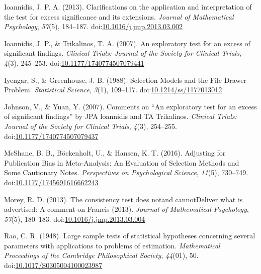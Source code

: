 \documentclass[man,floatsintext]{apa6}
\begin{document}
\leavevmode\hypertarget{ref-ioannidis2013ClarificationsApplicationInterpretation}{}%
Ioannidis, J. P. A. (2013). Clarifications on the application and interpretation of the test for excess significance and its extensions. \emph{Journal of Mathematical Psychology}, \emph{57}(5), 184--187. doi:\href{https://doi.org/10.1016/j.jmp.2013.03.002}{10.1016/j.jmp.2013.03.002}

\leavevmode\hypertarget{ref-ioannidis2007ExploratoryTestExcess}{}%
Ioannidis, J. P., \& Trikalinos, T. A. (2007). An exploratory test for an excess of significant findings. \emph{Clinical Trials: Journal of the Society for Clinical Trials}, \emph{4}(3), 245--253. doi:\href{https://doi.org/10.1177/1740774507079441}{10.1177/1740774507079441}

\leavevmode\hypertarget{ref-iyengar1988SelectionModelsFile}{}%
Iyengar, S., \& Greenhouse, J. B. (1988). Selection Models and the File Drawer Problem. \emph{Statistical Science}, \emph{3}(1), 109--117. doi:\href{https://doi.org/10.1214/ss/1177013012}{10.1214/ss/1177013012}

\leavevmode\hypertarget{ref-johnson2007CommentsExploratoryTest}{}%
Johnson, V., \& Yuan, Y. (2007). Comments on ``An exploratory test for an excess of significant findings'' by JPA loannidis and TA Trikalinos. \emph{Clinical Trials: Journal of the Society for Clinical Trials}, \emph{4}(3), 254--255. doi:\href{https://doi.org/10.1177/1740774507079437}{10.1177/1740774507079437}

\leavevmode\hypertarget{ref-mcshane2016AdjustingPublicationBias}{}%
McShane, B. B., Böckenholt, U., \& Hansen, K. T. (2016). Adjusting for Publication Bias in Meta-Analysis: An Evaluation of Selection Methods and Some Cautionary Notes. \emph{Perspectives on Psychological Science}, \emph{11}(5), 730--749. doi:\href{https://doi.org/10.1177/1745691616662243}{10.1177/1745691616662243}

\leavevmode\hypertarget{ref-morey2013ConsistencyTestDoes}{}%
Morey, R. D. (2013). The consistency test does notand cannotDeliver what is advertised: A comment on Francis (2013). \emph{Journal of Mathematical Psychology}, \emph{57}(5), 180--183. doi:\href{https://doi.org/10.1016/j.jmp.2013.03.004}{10.1016/j.jmp.2013.03.004}

\leavevmode\hypertarget{ref-rao1948LargeSampleTests}{}%
Rao, C. R. (1948). Large sample tests of statistical hypotheses concerning several parameters with applications to problems of estimation. \emph{Mathematical Proceedings of the Cambridge Philosophical Society}, \emph{44}(01), 50. doi:\href{https://doi.org/10.1017/S0305004100023987}{10.1017/S0305004100023987}
\end{document}
